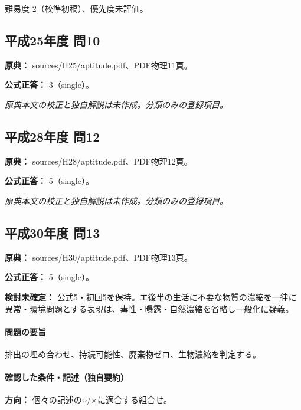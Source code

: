 \par 難易度 2（校準初稿）、優先度未評価。

\subsection{平成25年度 問10}
\label{q:h25-reg-apt-10}

\noindent\textbf{原典：} sources/H25/aptitude.pdf、PDF物理11頁。

\textbf{公式正答：} 3（single）。

\par\textit{原典本文の校正と独自解説は未作成。分類のみの登録項目。}

\subsection{平成28年度 問12}
\label{q:h28-reg-apt-12}

\noindent\textbf{原典：} sources/H28/aptitude.pdf、PDF物理12頁。

\textbf{公式正答：} 5（single）。

\par\textit{原典本文の校正と独自解説は未作成。分類のみの登録項目。}

\subsection{平成30年度 問13}
\label{q:h30-reg-apt-13}

\noindent\textbf{原典：} sources/H30/aptitude.pdf、PDF物理13頁。

\textbf{公式正答：} 5（single）。

\par\textbf{検討未確定：} 公式5・初回5を保持。エ後半の生活に不要な物質の濃縮を一律に異常・環境問題とする表現は、毒性・曝露・自然濃縮を省略し一般化に疑義。

\paragraph{問題の要旨} 排出の埋め合わせ、持続可能性、廃棄物ゼロ、生物濃縮を判定する。

\paragraph{確認した条件・記述（独自要約）}\mbox{}\par

\noindent\textbf{方向：} 個々の記述の○/×に適合する組合せ。\par

